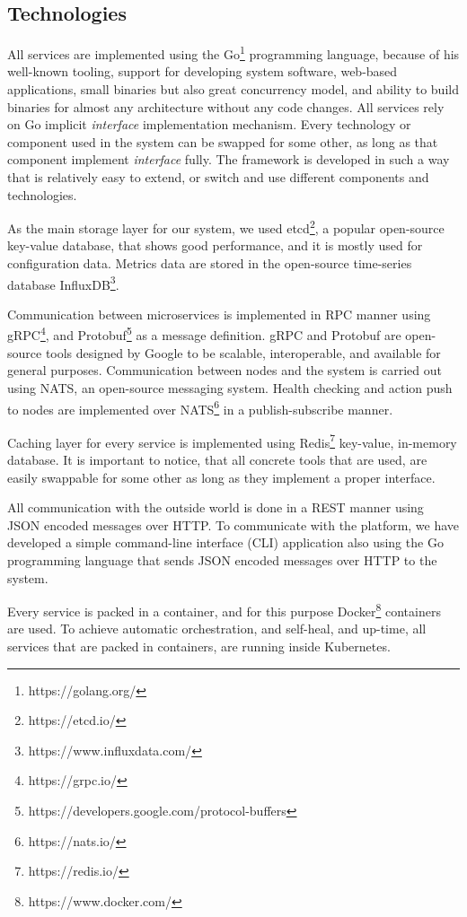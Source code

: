 \subsection{Technologies}\label{sec:technologies}
%
All services are implemented using the Go\footnote{https://golang.org/} programming language, because of his well-known tooling, support for developing system software, web-based applications, small binaries but also great concurrency model, and ability to build binaries for almost any architecture without any code changes. All services rely on Go implicit \emph{interface} implementation mechanism. Every technology or component used in the system can be swapped for some other, as long as that component implement \emph{interface} fully. The framework is developed in such a way that is relatively easy to extend, or switch and use different components and technologies.

As the main storage layer for our system, we used etcd\footnote{https://etcd.io/}, a popular open-source key-value database, that shows good performance, and it is mostly used for configuration data. Metrics data are stored in the open-source time-series database InfluxDB\footnote{https://www.influxdata.com/}. 

Communication between microservices is implemented in RPC manner using gRPC\footnote{https://grpc.io/}, and Protobuf\footnote{https://developers.google.com/protocol-buffers} as a message definition. gRPC and Protobuf are open-source tools designed by Google to be scalable, interoperable, and available for general purposes. Communication between nodes and the system is carried out using NATS, an open-source messaging system. Health checking and action push to nodes are implemented over NATS\footnote{https://nats.io/} in a publish-subscribe manner.

Caching layer for every service is implemented using Redis\footnote{https://redis.io/} key-value, in-memory database. It is important to notice, that all concrete tools that are used, are easily swappable for some other as long as they implement a proper interface.

All communication with the outside world is done in a REST manner using JSON encoded messages over HTTP. To communicate with the platform, we have developed a simple command-line interface (CLI) application also using the Go programming language that sends JSON encoded messages over HTTP to the system.

Every service is packed in a container, and for this purpose Docker\footnote{https://www.docker.com/} containers are used. To achieve automatic orchestration, and self-heal, and up-time, all services that are packed in containers, are running inside Kubernetes.

